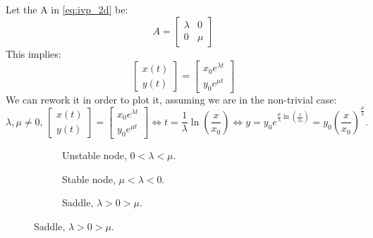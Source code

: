 \begin{example}
\label{ex:hyperbolic}
    Let the A in \autoref{eq:ivp_2d} be:
    \begin{equation*}
        A=\begin{bmatrix}
            \lambda & 0 \\
            0 & \mu
        \end{bmatrix}
    \end{equation*}
    This implies:
    \begin{equation*}
        \begin{bmatrix}
            x(t) \\ y(t)
        \end{bmatrix}=\begin{bmatrix}
            x_0e^{\lambda t} \\ y_0e^{\mu t}
        \end{bmatrix}
    \end{equation*}
    We can rework it in order to plot it, assuming we are in the non-trivial case:
    \begin{equation*}
        \lambda, \mu\neq0,\, \begin{bmatrix}
            x(t) \\ y(t)
        \end{bmatrix}=\begin{bmatrix}
            x_0e^{\lambda t} \\ y_0e^{\mu t}
        \end{bmatrix}\Leftrightarrow t=\frac{1}{\lambda} \ln \left(\frac{x}{x_0}\right) \Leftrightarrow y=y_0e^{\frac{\mu}{\lambda} \ln\left(\frac{x}{x_0}\right)}=y_0(\frac{x}{x_0})^{\frac{\mu}{\lambda}}. 
    \end{equation*}

\begin{figure}[ht]
    \centering
    \begin{subfigure}[t]{0.32\textwidth}
        \centering
        \caption{Unstable node, $0<\lambda<\mu$.}
    \end{subfigure}\hfill
    \begin{subfigure}[t]{0.32\textwidth}
        \centering
        \caption{Stable node, $\mu<\lambda<0$.}
    \end{subfigure}\hfill
    \begin{subfigure}[t]{0.32\textwidth}
        \centering
        \caption{Saddle, $\lambda>0>\mu$.}
    \end{subfigure}


\end{figure}
\end{example}
